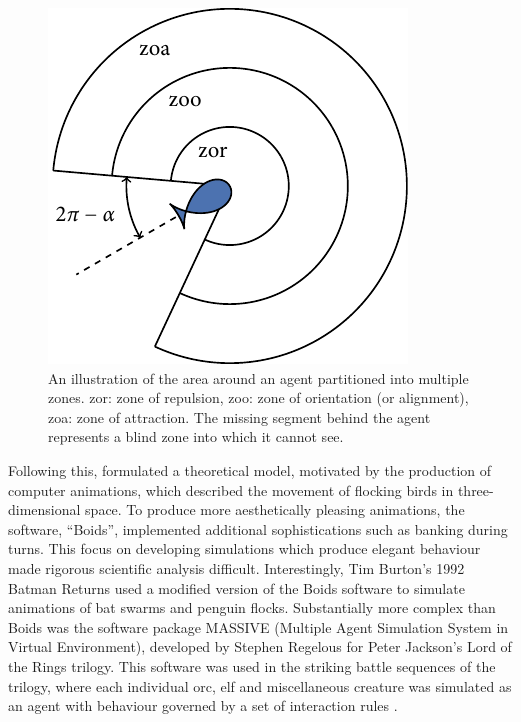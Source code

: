 \begin{figure}[t]
	\includegraphics{zonal_tikz.pdf}
	\caption{An illustration of the area around an agent partitioned into multiple zones. zor: zone of repulsion, zoo: zone of orientation (or alignment), zoa: zone of attraction. The missing segment behind the agent represents a blind zone into which it cannot see.}
	\label{fig:zone_illustration}
\end{figure}

Following this, \citet{reynolds87} formulated a theoretical model, motivated by the production of computer animations, which described the movement of flocking birds in three-dimensional space. To produce more aesthetically pleasing animations, the software, ``Boids'', implemented additional sophistications such as banking during turns. This focus on developing simulations which produce elegant behaviour made rigorous scientific analysis difficult. Interestingly, Tim Burton's 1992 Batman Returns used a modified version of the Boids software to simulate animations of bat swarms and penguin flocks. Substantially more complex than Boids was the software package MASSIVE (Multiple Agent Simulation System in Virtual Environment), developed by Stephen Regelous for Peter Jackson's Lord of the Rings trilogy. This software was used in the striking battle sequences of the trilogy, where each individual orc, elf and miscellaneous creature was simulated as an agent with behaviour governed by a set of interaction rules \citep{robbins17}.

